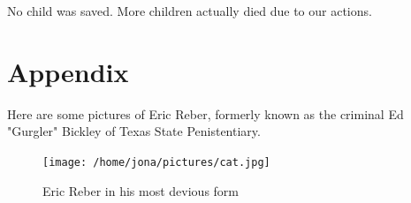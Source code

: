 \documentclass[onecolumn,10pt,cleanfoot]{asme2ej}
\begin{document}
No child was saved. More children actually died due to our actions.




\section*{Appendix}

Here are some pictures of Eric Reber, formerly known as the criminal Ed "Gurgler" Bickley of Texas State Penistentiary.


\begin{figure}[h]
\centerline{\texttt{[image: /home/jona/pictures/cat.jpg]}}
\caption{Eric Reber in his most devious form}
\label{real1msetraintest}
\end{figure}
\end{document}
